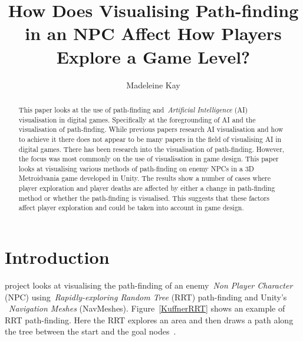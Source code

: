 \documentclass[journal]{IEEEtran}
\begin{document}
	\title{ How Does Visualising Path-finding in an NPC Affect How Players Explore a Game Level?}
	\author{Madeleine Kay}
	
	
	\maketitle
	
	\begin{abstract}
		This paper looks at the use of path-finding and~\textit{Artificial Intelligence} (AI) visualisation in digital games.  Specifically at the foregrounding of AI and the visualisation of path-finding. 
		While previous papers research AI visualisation and how to achieve it there does not appear to be many papers in the field of visualising AI in digital games.  
		There has been research into the visualisation of path-finding. However, the focus was most commonly on the use of visualisation in game design. 
		This paper looks at visualising various methods of path-finding on enemy NPCs in a 3D Metroidvania game developed in Unity.
		The results show a number of cases where player exploration and player deaths are affected by either a change in path-finding method or whether the path-finding is visualised. This suggests that these factors affect player exploration and could be taken into account in game design.
	\end{abstract}
	
	\section{Introduction} \label{introduction}
	 project looks at visualising the path-finding of an enemy~\textit{Non Player Character} (NPC) using~\textit{Rapidly-exploring Random Tree} (RRT) path-finding and Unity's ~\textit{Navigation Meshes} (NavMeshes).  Figure~\ref{KuffnerRRT} shows an example of RRT path-finding. Here the RRT explores an area and then draws a path along the tree between the start and the goal nodes~\cite{Kuffner2000}. 
	
\end{document}
